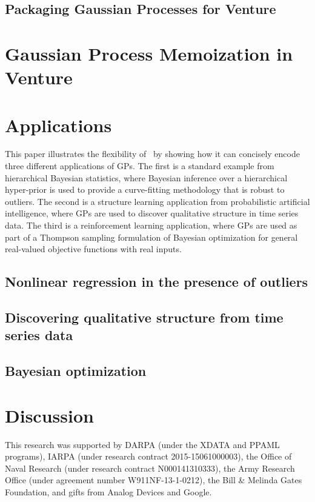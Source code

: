 \documentclass[twoside,11pt]{article}
\begin{document}
\subsection{Packaging Gaussian Processes for Venture}

\section{Gaussian Process Memoization in Venture}


\section{Applications}
This paper illustrates the flexibility of \gpmem\ by showing how it can concisely encode three different applications of \ac{GP}s.
The first is a standard example from hierarchical Bayesian statistics, where Bayesian inference over a hierarchical hyper-prior is used to provide a curve-fitting methodology that is robust to outliers.
The second is a structure learning application from probabilistic artificial intelligence, where \ac{GP}s are used to discover qualitative structure in time series data.
The third is a reinforcement learning application, where \ac{GP}s are used as part of a Thompson sampling formulation of Bayesian optimization for general real-valued objective functions with real inputs.

\subsection{Nonlinear regression in the presence of outliers}

\subsection{Discovering qualitative structure from time series data}\label{sec:structurelearning}


\subsection{Bayesian optimization}

\label{sec:thompson}




\section{Discussion}

This research was supported by DARPA
  (under the XDATA and PPAML programs), IARPA (under research contract
  2015-15061000003), the Office of Naval Research (under research
  contract N000141310333), the Army Research Office (under agreement
  number W911NF-13-1-0212), the Bill \& Melinda Gates Foundation, and
  gifts from Analog Devices and Google.
\newpage
\end{document}
